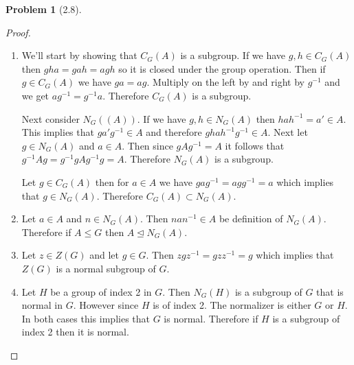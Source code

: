 \documentclass[10pt]{article}
\newcommand{\sk}{\vskip 10mm}
\theoremstyle{plain}
\newtheorem{problem}{Problem}
\theoremstyle{remark}
\begin{document}
\sk

\begin{problem}[2.8]
  
\end{problem}

\begin{proof}
  \begin{enumerate}
  \item We'll start by showing that $C_G(A)$ is a subgroup. If we have $g,h\in C_G(A)$
    then $gha=gah=agh$ so it is closed under the group operation. Then if $g\in C_G(A)$
    we have $ga=ag$. Multiply on the left by and right by $g^{-1}$ and we get
    $ag^{-1}=g^{-1}a$. Therefore $C_G(A)$ is a subgroup.

    Next consider $N_G((A))$. If we have $g,h\in N_G(A)$ then $hah^{-1}=a'\in A$. This
    implies that $ga'g^{-1}\in A$ and therefore $ghah^{-1}g^{-1}\in A$. Next let $g\in N_G(A)$
    and $a\in A$. Then since $gAg^{-1}=A$ it follows that $g^{-1}Ag=g^{-1}gAg^{-1}g=A$.
    Therefore $N_G(A)$ is a subgroup.

    Let $g\in C_G(A)$ then for $a\in A$ we have $gag^{-1}=agg^{-1}=a$ which implies that
    $g\in N_G(A)$. Therefore $C_G(A)\subset N_G(A)$.
  \item Let $a\in A$ and $n\in N_G(A)$. Then $nan^{-1}\in A$ be definition of $N_G(A)$. Therefore
    if $A\leq G$ then $A\trianglelefteq N_G(A)$.
  \item Let $z\in Z(G)$ and let $g\in G$. Then $zgz^{-1}=gzz^{-1}=g$ which implies that
    $Z(G)$ is a normal subgroup of $G$.
  \item
    Let $H$ be a group of index 2 in $G$. Then $N_G(H)$ is a subgroup of $G$ that is
    normal in $G$. However since $H$ is of index 2. The normalizer is either $G$ or
    $H$. In both cases this implies that $G$ is normal.
    Therefore if $H$ is a subgroup of index 2 then it is normal.


\end{enumerate}
\end{proof}
\end{document}
